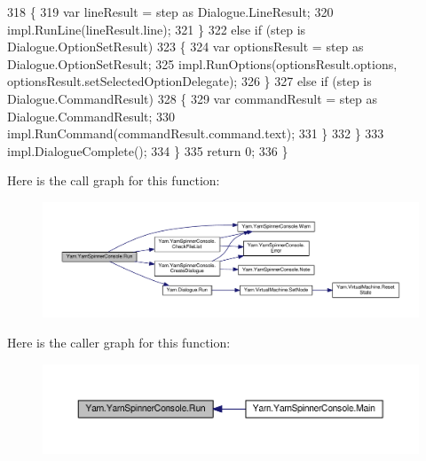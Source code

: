 \begin{DoxyCode}
318                     \{
319                         var lineResult = step as Dialogue.LineResult;
320                         impl.RunLine(lineResult.line);
321                     \}
322                     \textcolor{keywordflow}{else} \textcolor{keywordflow}{if} (step is Dialogue.OptionSetResult)
323                     \{
324                         var optionsResult = step as Dialogue.OptionSetResult;
325                         impl.RunOptions(optionsResult.options, optionsResult.setSelectedOptionDelegate);
326                     \}
327                     \textcolor{keywordflow}{else} \textcolor{keywordflow}{if} (step is Dialogue.CommandResult)
328                     \{
329                         var commandResult = step as Dialogue.CommandResult;
330                         impl.RunCommand(commandResult.command.text);
331                     \}
332                 \}
333                 impl.DialogueComplete();
334             \}
335             \textcolor{keywordflow}{return} 0;
336         \}
\end{DoxyCode}


Here is the call graph for this function\-:
\nopagebreak
\begin{figure}[H]
\begin{center}
\leavevmode
\includegraphics[width=350pt]{a00195_a1b974c55540795a9e643c2ec055fbd51_cgraph}
\end{center}
\end{figure}




Here is the caller graph for this function\-:
\nopagebreak
\begin{figure}[H]
\begin{center}
\leavevmode
\includegraphics[width=350pt]{a00195_a1b974c55540795a9e643c2ec055fbd51_icgraph}
\end{center}
\end{figure}


